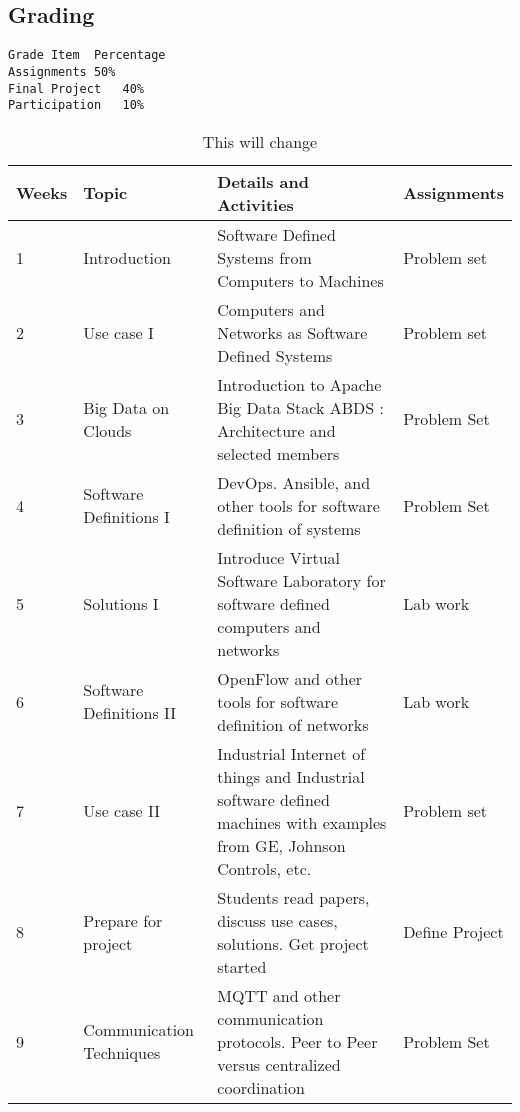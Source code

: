 \subsection{Grading}

\begin{verbatim}
Grade Item	Percentage
Assignments	50%
Final Project	40%
Participation	10%
\end{verbatim}

\begin{table}[h]
\centering
\caption{This will change}
\label{T:e621}
\begin{tabular}{p{1cm}p{4cm}p{6cm}p{2cm}}
Weeks & Topic                    & Details and Activities  & Assignments          \\
\hline
1     & Introduction             & Software Defined Systems from Computers to Machines                                                                  & Problem set          \\
2     & Use case I               & Computers and Networks as Software Defined Systems                                                                   & Problem set          \\
3     & Big Data on Clouds       & Introduction to Apache Big Data Stack ABDS : Architecture and selected members                                       & Problem Set          \\
4     & Software Definitions I   & DevOps. Ansible, and other tools for software definition of systems                                                  & Problem Set          \\
5     & Solutions I              & Introduce Virtual Software Laboratory for software defined computers and networks                                    & Lab work             \\
6     & Software Definitions II  & OpenFlow and other tools for software definition of networks                                                         & Lab work             \\
7     & Use case II              & Industrial Internet of things and Industrial software defined machines with examples from GE, Johnson Controls, etc. & Problem set          \\
8     & Prepare for project      & Students read papers, discuss use cases, solutions. Get project started                                              & Define Project       \\
9     & Communication Techniques & MQTT and other communication protocols. Peer to Peer versus centralized coordination                                 & Problem Set          \\

\end{tabular}
\end{table}
